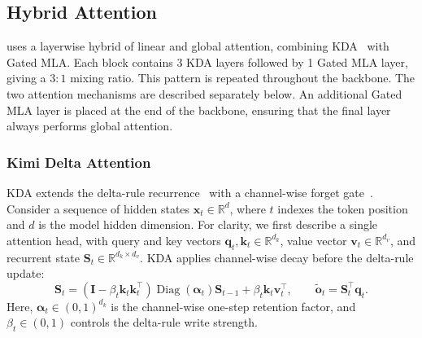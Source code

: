 \subsection{Hybrid Attention}
\label{sec:hybrid-attn}

 uses a layerwise hybrid of linear and global attention, combining KDA~\citep{team2025kimi} with Gated MLA.
Each block contains 3 KDA layers followed by 1 Gated MLA layer, giving a $3{:}1$ mixing ratio.
This pattern is repeated throughout the backbone.
The two attention mechanisms are described separately below. An additional Gated MLA layer is placed at the end of the backbone, ensuring that the final layer always performs global attention.

\subsubsection{Kimi Delta Attention}
\label{sec:kda}

KDA extends the delta-rule recurrence~\citep{schlag-2021-deltanet,yang-2025-gdn} with a channel-wise forget gate~\citep{team2025kimi}.
Consider a sequence of hidden states $\bm{x}_t\in\mathbb{R}^d$, where $t$ indexes the token position and $d$ is the model hidden dimension.
For clarity, we first describe a single attention head, with query and key vectors $\bm{q}_t,\bm{k}_t\in\mathbb{R}^{d_k}$, value vector $\bm{v}_t\in\mathbb{R}^{d_v}$, and recurrent state $\mathbf{S}_t\in\mathbb{R}^{d_k\times d_v}$.
KDA applies channel-wise decay before the delta-rule update:
\begin{equation}
    \mathbf{S}_t
    = \left(\mathbf{I}-\beta_t\bm{k}_t\bm{k}_t^{\top}\right)
    \operatorname{Diag}(\bm{\alpha}_t)\mathbf{S}_{t-1}
    + \beta_t\bm{k}_t\bm{v}_t^{\top},
    \qquad
    \tilde{\bm{o}}_t = \mathbf{S}_t^{\top}\bm{q}_t.
    \label{eq:recurrent_KDA}
\end{equation}
Here, $\bm{\alpha}_t\in(0,1)^{d_k}$ is the channel-wise one-step retention factor, and $\beta_t\in(0,1)$ controls the delta-rule write strength.

